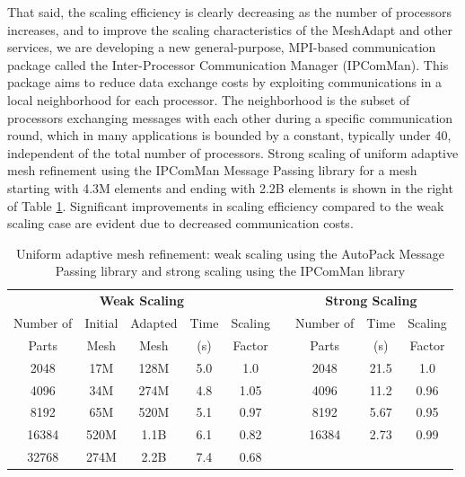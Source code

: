 \documentclass[letterpaper]{jpconf}
\begin{document}
That said, the scaling efficiency is clearly decreasing as the number
of processors increases, and to improve the scaling characteristics of
the MeshAdapt and other services, we are developing a new general-purpose,
MPI-based communication package called the Inter-Processor
Communication Manager (IPComMan).  This package aims to reduce data
exchange costs by exploiting communications in a local neighborhood
for each processor. The neighborhood is the subset of processors
exchanging messages with each other during a specific communication
round, which in many applications is bounded by a constant, typically
under 40, independent of the total number of processors. 
Strong scaling of uniform adaptive mesh refinement using the IPComMan
Message Passing library for a mesh starting with 4.3M elements and
ending with 2.2B elements is shown in the right of Table
\ref{tab:refinement_scaling}.  Significant improvements in scaling efficiency
compared to the weak scaling case are evident due to decreased communication
costs.

\begin{table}[htbp]
\begin{center}
\caption{Uniform adaptive mesh refinement: weak scaling using the AutoPack Message Passing library and strong scaling using the IPComMan library}
\label{tab:refinement_scaling}
\begin{tabular}{|c|c|c|c|c|c|c|c|c|}
\cline{1-5}  
\cline{7-9}
\multicolumn{5}{|c|}{\bf Weak Scaling} & &
\multicolumn{3}{|c|}{\bf Strong Scaling} \\
\cline{1-5}  
\cline{7-9}
Number of & Initial & Adapted & Time & Scaling & & Number of & Time &
Scaling \\ 
Parts & Mesh & Mesh & (s) & Factor & &  Parts & (s) & Factor\\
\cline{1-5}  
\cline{7-9}
2048 & 17M & 128M & 5.0 & 1.0 & & 
2048 & 21.5 & 1.0 \\
4096 & 34M & 274M & 4.8 & 1.05 & &
4096 & 11.2 & 0.96 \\
8192 & 65M & 520M & 5.1 & 0.97 & &
8192 & 5.67 & 0.95\\
16384 & 520M & 1.1B & 6.1 & 0.82& &
16384 & 2.73 & 0.99\\
\cline{7-9}
32768 & 274M & 2.2B & 7.4 & 0.68 &   \multicolumn{4}{c}{}  \\
\cline{1-5}
\end{tabular}
\end{center}
\end{table}
\end{document}
